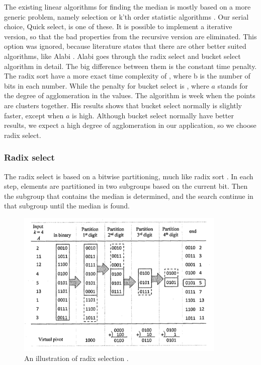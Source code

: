 The existing linear algorithms for finding the median is mostly based on a more generic problem, namely selection or k'th order statistic algorithms \citep[Chapter 9]{Cormen:2001}. Our serial choice, Quick select, is one of these. It is possible to implement a iterative version, so that the bad properties from the recursive version are eliminated. This option was ignored, because literature states that there are other better suited algorithms, like Alabi \citep{Alabi:2012}. Alabi goes through the radix select and bucket select algorithm in detail. The big difference between them is the constant time penalty. The radix sort have a more exact time complexity of , where b is the number of bits in each number. While the penalty for bucket select is , where $a$ stands for the degree of agglomeration in the values. The algorithm is week when the points are clusters together. His results shows that bucket select normally is slightly faster, except when $a$ is high. Although bucket select normally have better results, we expect a high degree of agglomeration in our application, so we choose radix select.


\subsubsection{Radix select} %
\label{ssub:radix_select}


The radix select is based on a bitwise partitioning, much like radix sort \cite[Chapter 8.3]{Cormen:2001}. In each step, elements are partitioned in two subgroups based on the current bit. Then the subgroup that contains the median is determined, and the search continue in that subgroup until the median is found.

\begin{figure}[ht!]
\centering
\includegraphics[width=100mm]{../gfx/Radix_select.png}

\caption{An illustration of radix selection \cite{cayman:2012}.}
\label{fig:radix_select}
\end{figure}

